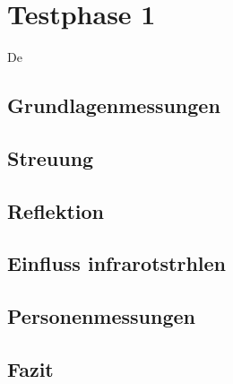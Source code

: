 \chapter{Testphase 1}
\label{chap:Testphasen}

De

\section{Grundlagenmessungen}



\section{Streuung}


\section{Reflektion}


\section{Einfluss infrarotstrhlen}



\section{Personenmessungen}
















\section{Fazit}